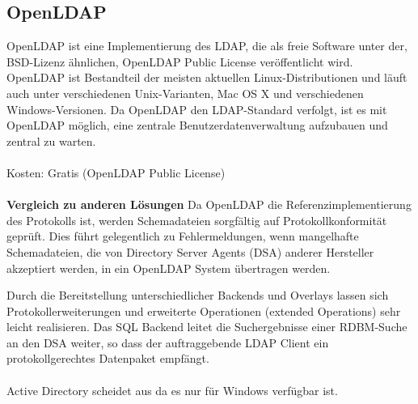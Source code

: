 \documentclass[main.tex]{subfiles}
\begin{document}
\subsection{OpenLDAP}
OpenLDAP ist eine Implementierung des LDAP, die als freie Software unter der, BSD-Lizenz ähnlichen, 
OpenLDAP Public License veröffentlicht wird. OpenLDAP ist Bestandteil der meisten aktuellen
Linux-Distributionen und läuft auch unter verschiedenen Unix-Varianten, Mac OS X und verschiedenen Windows-Versionen.
Da OpenLDAP den LDAP-Standard verfolgt, ist es mit OpenLDAP möglich,
eine zentrale Benutzerdatenverwaltung aufzubauen und zentral zu warten.
\\\\
Kosten: Gratis (OpenLDAP Public License)
\\\\
\textbf{Vergleich zu anderen Lösungen}
Da OpenLDAP die Referenzimplementierung des Protokolls ist, werden Schemadateien sorgfältig
auf Protokollkonformität geprüft. Dies führt gelegentlich zu Fehlermeldungen, wenn mangelhafte Schemadateien,
die von Directory Server Agents (DSA) anderer Hersteller akzeptiert werden, in ein OpenLDAP System übertragen werden.

Durch die Bereitstellung unterschiedlicher Backends und Overlays lassen sich Protokollerweiterungen und
erweiterte Operationen (extended Operations) sehr leicht realisieren. Das SQL Backend leitet die
Suchergebnisse einer RDBM-Suche an den DSA weiter, so dass der auftraggebende LDAP Client ein
protokollgerechtes Datenpaket empfängt.
 \\\\
 Active Directory scheidet aus da es nur für Windows verfügbar ist.
\end{document}
